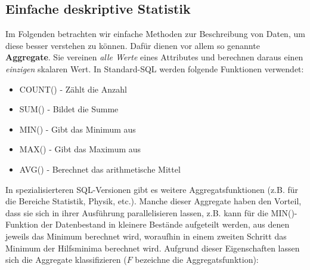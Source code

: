 \subsection{Einfache deskriptive Statistik}
Im Folgenden betrachten wir einfache Methoden zur Beschreibung von Daten, um
diese besser verstehen zu können. Dafür dienen vor allem so genannte
\textbf{Aggregate}. Sie vereinen \textit{alle Werte} eines Attributes und
berechnen daraus einen \textit{einzigen} skalaren Wert. In Standard-SQL werden
folgende Funktionen verwendet: 
\begin{itemize}
	\item COUNT() - Zählt die Anzahl
	\item SUM() - Bildet die Summe
	\item MIN() - Gibt das Minimum aus
	\item MAX() - Gibt das Maximum aus
	\item AVG() - Berechnet das arithmetische Mittel
\end{itemize}
In spezialisierteren SQL-Versionen gibt es weitere Aggregatsfunktionen (z.B.
für die Bereiche Statistik, Physik, etc.). Manche dieser Aggregate haben den
Vorteil, dass sie sich in ihrer Ausführung parallelisieren lassen, z.B. kann
für die MIN()-Funktion der Datenbestand in kleinere Bestände aufgeteilt werden,
aus denen jeweils das Minimum berechnet wird, woraufhin in einem zweiten
Schritt das Minimum der Hilfsminima berechnet wird.
Aufgrund dieser Eigenschaften lassen sich die Aggregate klassifizieren (\(F\)
bezeichne die Aggregatsfunktion):
